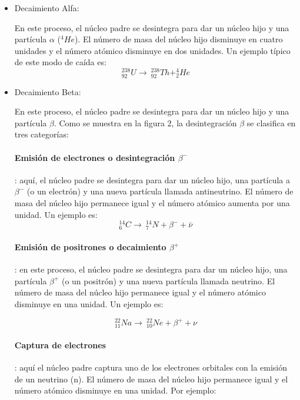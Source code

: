 \begin{itemize}
	\item Decaimiento Alfa:
	
	En este proceso, el núcleo padre se desintegra para dar un núcleo hijo y una partícula $\alpha$ ($^{4} He$). El número de masa del núcleo hijo disminuye en cuatro unidades y el número atómico disminuye en dos unidades. Un ejemplo típico de este modo de caída es: 
	\begin{equation}
		^{238} _{92} U \longrightarrow \ ^{238} _{92} Th + ^{4} _{2} He
	\end{equation}
	
	\item Decaimiento Beta:
	
	En este proceso, el núcleo padre se desintegra para dar un núcleo hijo y una partícula $\beta $. Como se muestra en la figura 2, la desintegración $\beta $ se clasifica en tres categorías: 
	
    		\paragraph{Emisión de electrones o desintegración $\beta ^{-}$}: aquí, el núcleo padre se desintegra para dar un núcleo hijo, una partícula a $\beta ^{-}$ (o un electrón) y una nueva partícula llamada antineutrino. El número de masa del núcleo hijo permanece igual y el número atómico aumenta por una unidad. Un ejemplo es:
    	\begin{equation}
    		^{14} _{6} C \longrightarrow \ ^{14} _{7} N + \beta ^{-} + \bar{\nu }
    	\end{equation}
    	
    	\paragraph{Emisión de positrones o decaimiento $\beta ^{+}$}: en este proceso, el núcleo padre se desintegra para dar un núcleo hijo, una partícula $\beta ^{+}$ (o un positrón) y una nueva partícula llamada neutrino. El número de masa del núcleo hijo permanece igual y el número atómico disminuye en una unidad. Un ejemplo es:
    
    	\begin{equation}
    		^{22} _{11} Na \longrightarrow \ ^{22} _{10} Ne + \beta ^{+} + \nu 
    	\end{equation}
    	
    	\paragraph{Captura de electrones}: aquí el núcleo padre captura uno de los electrones orbitales con la emisión de un neutrino (n). El número de masa del núcleo hijo permanece igual y el número atómico disminuye en una unidad. Por ejemplo: 
    	

\end{itemize}
